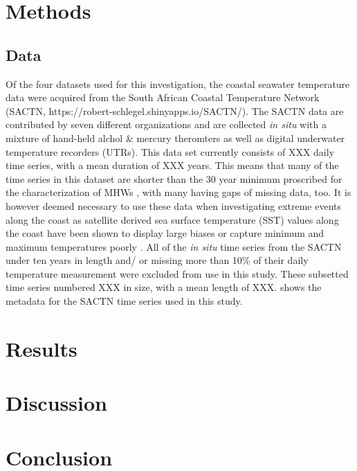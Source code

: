 \documentclass[a4paper,10pt,review]{elsarticle}
\begin{document}
\section{Methods}
\subsection{Data}
Of the four datasets used for this investigation, the coastal seawater temperature data were acquired from the South African Coastal Temperature Network (SACTN, https://robert-schlegel.shinyapps.io/SACTN/). The SACTN data are contributed by seven different organizations and are collected \emph{in situ} with a mixture of hand-held alchol & mercury theromters as well as digital underwater temperature recorders (UTRs). This data set currently consists of XXX daily time series, with a mean duration of XXX years. This means that many of the time series in this dataset are shorter than the 30 year minimum proscribed for the characterization of MHWs \citep{Hobday2016}, with many having gaps of missing data, too. It is however deemed necessary to use these data when investigating extreme events along the coast as satellite derived sea surface temperature (SST) values along the coast have been shown to display large biases \citep{Smit2013} or capture minimum and maximum temperatures poorly \citep{Smale2009, Castillo2010}. All of the \emph{in situ} time series from the SACTN under ten years in length and/ or missing more than 10\% of their daily temperature measurement were excluded from use in this study. These subsetted time series numbered XXX in size, with a mean length of XXX.  shows the metadata for the SACTN time series used in this study.

\section{Results}

\section{Discussion}

\section{Conclusion}
\end{document}
